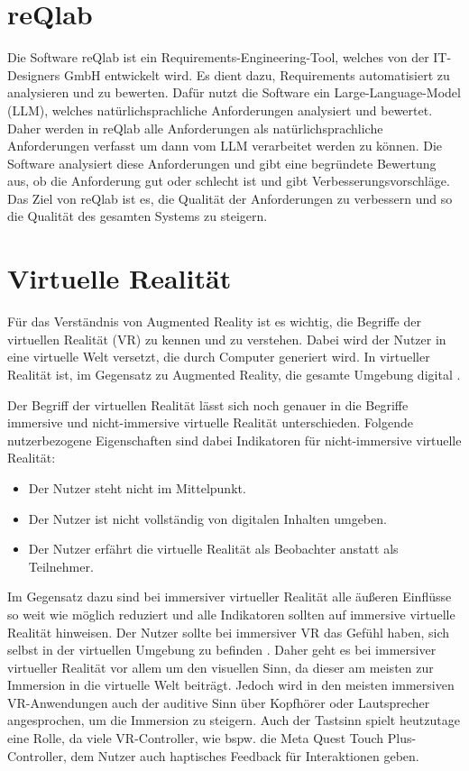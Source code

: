   \section{reQlab}

  Die Software reQlab ist ein Requirements-Engineering-Tool, welches von der IT-Designers GmbH entwickelt wird.
  Es dient dazu, Requirements automatisiert zu analysieren und zu bewerten.
  Dafür nutzt die Software ein Large-Language-Model (LLM), welches natürlichsprachliche Anforderungen analysiert und bewertet.
  Daher werden in reQlab alle Anforderungen als natürlichsprachliche Anforderungen verfasst um dann vom LLM verarbeitet werden zu können.
  Die Software analysiert diese Anforderungen und gibt eine begründete Bewertung aus, ob die Anforderung gut oder schlecht ist und gibt Verbesserungsvorschläge.
  Das Ziel von reQlab ist es, die Qualität der Anforderungen zu verbessern und so die Qualität des gesamten Systems zu steigern.


  \section{Virtuelle Realität}
  Für das Verständnis von Augmented Reality ist es wichtig, die Begriffe der virtuellen Realität (VR) zu kennen und zu verstehen.
  Dabei wird der Nutzer in eine virtuelle Welt versetzt, die durch Computer generiert wird.
  In virtueller Realität ist, im Gegensatz zu Augmented Reality, die gesamte Umgebung digital
  \autocite[vgl.][S.15]{Dalton2023}.

  Der Begriff der virtuellen Realität lässt sich noch genauer in die Begriffe immersive und nicht-immersive virtuelle Realität unterschieden.
  Folgende nutzerbezogene Eigenschaften sind dabei Indikatoren für nicht-immersive virtuelle Realität:
  \begin{itemize}
    \item Der Nutzer steht nicht im Mittelpunkt.
    \item Der Nutzer ist nicht vollständig von digitalen Inhalten umgeben.
    \item Der Nutzer erfährt die virtuelle Realität als Beobachter anstatt als Teilnehmer.
  \end{itemize}
  Im Gegensatz dazu sind bei immersiver virtueller Realität alle äußeren Einflüsse so weit wie möglich reduziert und alle Indikatoren sollten auf immersive virtuelle Realität hinweisen.
  Der Nutzer sollte bei immersiver VR das Gefühl haben, sich selbst in der virtuellen Umgebung zu befinden \autocite[vgl.][S.23-24]{Wolfel2023}.
  Daher geht es bei immersiver virtueller Realität vor allem um den visuellen Sinn, da dieser am meisten zur Immersion in die virtuelle Welt beiträgt.
  Jedoch wird in den meisten immersiven VR-Anwendungen auch der auditive Sinn über Kopfhörer oder Lautsprecher angesprochen, um die Immersion zu steigern.
  Auch der Tastsinn spielt heutzutage eine Rolle, da viele VR-Controller, wie bspw. die Meta Quest Touch Plus-Controller, dem Nutzer auch haptisches Feedback für Interaktionen geben.

